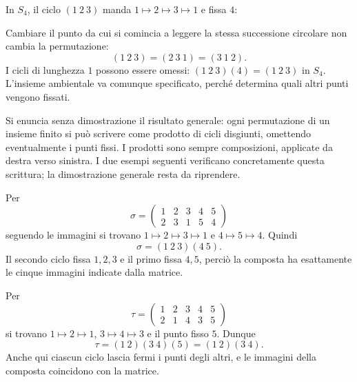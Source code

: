 \begin{esempio}
In $S_4$, il ciclo $(1\ 2\ 3)$ manda $1\mapsto2\mapsto3\mapsto1$ e fissa $4$:
\begin{center}
\end{center}
Cambiare il punto da cui si comincia a leggere la stessa successione circolare non cambia la permutazione:
\[
(1\ 2\ 3)=(2\ 3\ 1)=(3\ 1\ 2).
\]
I cicli di lunghezza $1$ possono essere omessi: $(1\ 2\ 3)(4)=(1\ 2\ 3)$ in $S_4$. L'insieme ambientale va comunque specificato, perché determina quali altri punti vengono fissati.
\end{esempio}

\begin{osservazione}
Si enuncia senza dimostrazione il risultato generale: ogni permutazione di un insieme finito si può scrivere come prodotto di cicli disgiunti, omettendo eventualmente i punti fissi. I prodotti sono sempre composizioni, applicate da destra verso sinistra. I due esempi seguenti verificano concretamente questa scrittura; la dimostrazione generale resta da riprendere.
\end{osservazione}

\begin{esempio}
Per
\[
\sigma=\begin{pmatrix}1&2&3&4&5\\2&3&1&5&4\end{pmatrix}
\]
seguendo le immagini si trovano $1\mapsto2\mapsto3\mapsto1$ e $4\mapsto5\mapsto4$. Quindi
\[
\sigma=(1\ 2\ 3)(4\ 5).
\]
Il secondo ciclo fissa $1,2,3$ e il primo fissa $4,5$, perciò la composta ha esattamente le cinque immagini indicate dalla matrice.

Per
\[
\tau=\begin{pmatrix}1&2&3&4&5\\2&1&4&3&5\end{pmatrix}
\]
si trovano $1\mapsto2\mapsto1$, $3\mapsto4\mapsto3$ e il punto fisso $5$. Dunque
\[
\tau=(1\ 2)(3\ 4)(5)=(1\ 2)(3\ 4).
\]
Anche qui ciascun ciclo lascia fermi i punti degli altri, e le immagini della composta coincidono con la matrice.
\end{esempio}
